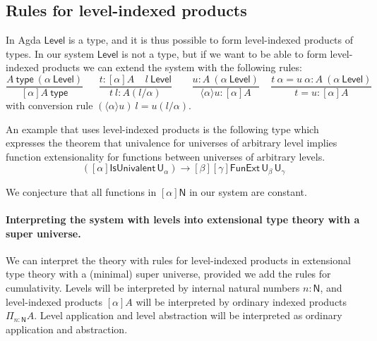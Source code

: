 \documentclass[11pt,a4paper]{article}
\newcommand{\lam}[2]{{\langle}#1{\rangle}#2}
\def\NN{\mathsf{N}}
\def\UU{\mathsf{U}}
\def\Level{\mathsf{Level}}
\newcommand{\type}{\mathsf{type}}
\newcommand{\T}{\mathsf{T}}
\begin{document}
%
%
%
%
%
%
%

\subsection*{Rules for level-indexed products}

In Agda $\Level$ is a type, and it is thus possible to form level-indexed products of types. In our system $\Level$ is not a type, but if we want to be able to form level-indexed products we can extend the system with the following rules:
$$
\frac{A~\type~(\alpha~\Level)}{[\alpha]A~\type}~~~~~~~
\frac{t:[\alpha]A~~~~~l~\Level}
     {t~l:A(l/\alpha)}~~~~~~~~~
\frac{u:A~(\alpha~\Level)}{\lam{\alpha}{u}: [\alpha]A}~~~~~
\frac{t~\alpha = u~\alpha:A~(\alpha~\Level)}{t = u:[\alpha]A}
$$
with conversion rule $(\lam{\alpha}{u})~l = u(l/\alpha)$.

An example that uses level-indexed products is the following type which  expresses the theorem that univalence for universes of arbitrary level implies function extensionality for functions between universes of arbitrary levels.
$$
([\alpha]\mathsf{IsUnivalent}\, \UU_\alpha)
\to [\beta][\gamma] \mathsf{FunExt}\, \UU_\beta\, \UU_\gamma
$$   
               
We conjecture that all functions in $[\alpha]\NN$ in our system
are constant. 

\paragraph{Interpreting the system with levels into extensional type theory with a super universe.} We can interpret the theory with rules for level-indexed products in extensional type theory with a (minimal) super universe, provided we add the rules for cumulativity. Levels will be interpreted by internal natural numbers $n : \NN$, and level-indexed products $[\alpha]A$ will be interpreted by ordinary indexed products $\Pi_{n : \NN}A$. Level application and level abstraction will be interpreted as ordinary application and abstraction.
\end{document}

